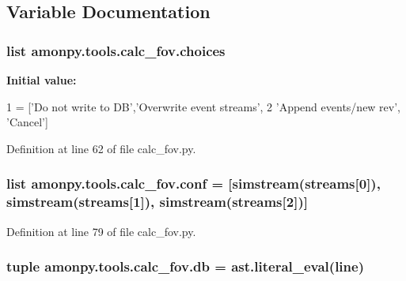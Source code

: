 \subsection{Variable Documentation}
\hypertarget{namespaceamonpy_1_1tools_1_1calc__fov_a1bc07dd3b189b89d03cd6bfb2ff9378f}{
\subsubsection[{choices}]{\setlength{\rightskip}{0pt plus 5cm}list amonpy.\-tools.\-calc\-\_\-fov.\-choices}}\label{namespaceamonpy_1_1tools_1_1calc__fov_a1bc07dd3b189b89d03cd6bfb2ff9378f}
{\bfseries Initial value\-:}
\begin{DoxyCode}
1 = [\textcolor{stringliteral}{'Do not write to DB'},\textcolor{stringliteral}{'Overwrite event streams'},
2            \textcolor{stringliteral}{'Append events/new rev'}, \textcolor{stringliteral}{'Cancel'}]
\end{DoxyCode}


Definition at line 62 of file calc\-\_\-fov.\-py.

\hypertarget{namespaceamonpy_1_1tools_1_1calc__fov_af4b4c00c118d28fce747695a24f9893a}{
\subsubsection[{conf}]{\setlength{\rightskip}{0pt plus 5cm}list amonpy.\-tools.\-calc\-\_\-fov.\-conf = \mbox{[}simstream({\bf streams}\mbox{[}0\mbox{]}), simstream({\bf streams}\mbox{[}1\mbox{]}), simstream({\bf streams}\mbox{[}2\mbox{]})\mbox{]}}}\label{namespaceamonpy_1_1tools_1_1calc__fov_af4b4c00c118d28fce747695a24f9893a}


Definition at line 79 of file calc\-\_\-fov.\-py.

\hypertarget{namespaceamonpy_1_1tools_1_1calc__fov_af18ce88a52b6ecd5b14ebc9efcde7cd1}{
\subsubsection[{db}]{\setlength{\rightskip}{0pt plus 5cm}tuple amonpy.\-tools.\-calc\-\_\-fov.\-db = ast.\-literal\-\_\-eval({\bf line})}}\label{namespaceamonpy_1_1tools_1_1calc__fov_af18ce88a52b6ecd5b14ebc9efcde7cd1}


